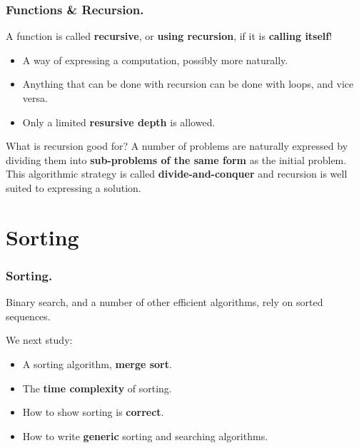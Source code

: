\documentclass{beamer} %
\newcommand\emc[1]{\textcolor{brightblue}{\textbf{#1}}}
\begin{document}
\begin{frame}
\frametitle{Functions \& Recursion.}

A function is called \emc{recursive}, or \emc{using recursion}, if it is \emc{calling itself}!
\begin{itemize}
	\item A way of expressing a computation, possibly more naturally.
	\item Anything that can be done with recursion can be done with loops, and vice versa.
	\item Only a limited \emc{resursive depth} is allowed.
\end{itemize}

\begin{block}{What is recursion good for?}
A number of problems are naturally expressed by dividing them into \emc{sub-problems of the same form} as the initial problem. This algorithmic strategy is called \emc{divide-and-conquer} and recursion is well suited to expressing a solution.
\end{block}

\end{frame}


\section{Sorting}

\begin{frame}
\frametitle{Sorting.}

Binary search, and a number of other efficient algorithms, rely on sorted sequences. 

\vspace{3mm}
We next study:
\begin{itemize}
	\item A sorting algorithm, \emc{merge sort}.
	\item The \emc{time complexity} of sorting.
	\item How to show sorting is \emc{correct}.
	\item How to write \emc{generic} sorting and searching algorithms.
\end{itemize}

\end{frame}
\end{document}
